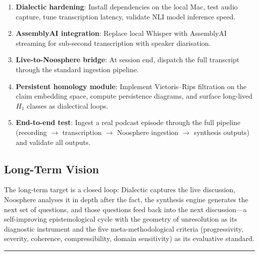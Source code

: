 \documentclass[11pt,letterpaper]{article}
\begin{document}
\begin{enumerate}
\item \textbf{Dialectic hardening}: Install dependencies on the local Mac, test audio capture, tune transcription latency, validate NLI model inference speed.
\item \textbf{AssemblyAI integration}: Replace local Whisper with AssemblyAI streaming for sub-second transcription with speaker diarisation.
\item \textbf{Live-to-Noosphere bridge}: At session end, dispatch the full transcript through the standard ingestion pipeline.
\item \textbf{Persistent homology module}: Implement Vietoris--Rips filtration on the claim embedding space, compute persistence diagrams, and surface long-lived $H_1$ classes as dialectical loops.
\item \textbf{End-to-end test}: Ingest a real podcast episode through the full pipeline (recording $\to$ transcription $\to$ Noosphere ingestion $\to$ synthesis outputs) and validate all outputs.
\end{enumerate}

\subsection{Long-Term Vision}

The long-term target is a closed loop: Dialectic captures the live discussion, Noosphere analyses it in depth after the fact, the synthesis engine generates the next set of questions, and those questions feed back into the next discussion---a self-improving epistemological cycle with the geometry of unresolution as its diagnostic instrument and the five meta-methodological criteria (progressivity, severity, coherence, compressibility, domain sensitivity) as its evaluative standard.

\vspace{1cm}
\begin{center}
\rule{3cm}{0.4pt}
\end{center}
\end{document}
